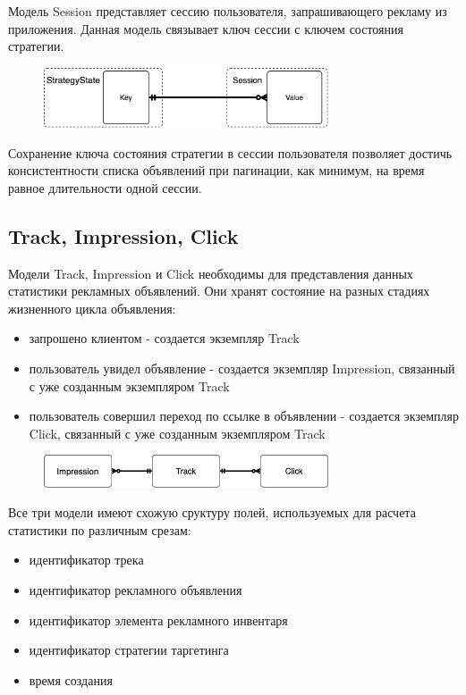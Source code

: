 \documentclass[times]{itmo-student-thesis}
\begin{document}
Модель Session представляет сессию пользователя, запрашивающего рекламу из приложения. Данная модель связывает ключ сессии с ключем состояния стратегии.

\begin{figure}[h]
\includegraphics[width=0.75\textwidth]{strategy-state-session}
\centering
\end{figure}
Сохранение ключа состояния стратегии в сессии пользователя позволяет достичь консистентности списка объявлений при пагинации, как минимум, на время равное длительности одной сессии.

\subsection{Track, Impression, Click}

Модели Track, Impression и Click необходимы для представления данных статистики рекламных объявлений. Они хранят состояние на разных стадиях жизненного цикла объявления: 
\begin{itemize}
\item запрошено клиентом - создается экземпляр Track
\item пользователь увидел объявление - создается экземпляр Impression, связанный с уже созданным экземпляром Track
\item пользователь совершил переход по ссылке в объявлении - создается экземпляр Click, связанный с уже созданным экземпляром Track
\end{itemize}

\begin{figure}[h]
\includegraphics[width=0.75\textwidth]{track-impression-click}
\centering
\end{figure}

Все три модели имеют схожую сруктуру полей, используемых для расчета статистики по различным срезам:
\begin{itemize}
\item идентификатор трека
\item идентификатор рекламного объявления
\item идентификатор элемента рекламного инвентаря
\item идентификатор стратегии таргетинга
\item время создания
\end{itemize}
\end{document}
